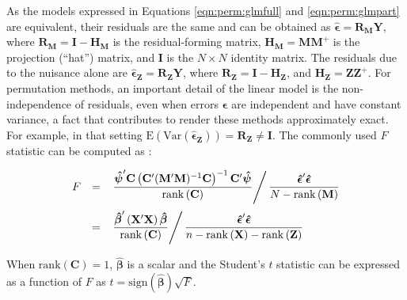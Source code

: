 As the models expressed in Equations \ref{eqn:perm:glmfull} and \ref{eqn:perm:glmpart} are equivalent, their residuals are the same and can be obtained as  $\boldsymbol{\hat{\epsilon}} = \mathbf{R}_{\mathbf{M}}\mathbf{Y}$, where $\mathbf{R}_{\mathbf{M}}=\mathbf{I}-\mathbf{H}_{\mathbf{M}}$ is the residual-forming matrix, $\mathbf{H}_{\mathbf{M}}=\mathbf{M}\mathbf{M}^{+}$ is the projection (``hat'') matrix, and $\mathbf{I}$ is the $N \times N$ identity matrix. The residuals due to the nuisance alone are $\boldsymbol{\hat{\epsilon}}_{\mathbf{Z}} = \mathbf{R}_{\mathbf{Z}}\mathbf{Y}$, where $\mathbf{R}_{\mathbf{Z}}=\mathbf{I}-\mathbf{H}_{\mathbf{Z}}$, and $\mathbf{H}_{\mathbf{Z}} = \mathbf{Z}\mathbf{Z}^{+}$. For permutation methods, an important detail of the linear model is the non-independence of residuals, even when errors $\boldsymbol{\epsilon}$ are independent and have constant variance, a fact that contributes to render these methods approximately exact. For example, in that setting $\mathrm{E}\left(\mathrm{Var}(\boldsymbol{\hat{\epsilon}_{\mathbf{Z}}})\right)=\mathbf{R}_{\mathbf{Z}}\neq\mathbf{I}$. The commonly used $F$ statistic can be computed as \citep{Christensen2002}:

\begin{equation}
\begin{array}{ccl}
F &=& \left.\dfrac{\boldsymbol{\hat{\psi}}'\mathbf{C} \left(\mathbf{C}'(\mathbf{M}'\mathbf{M})^{-1}\mathbf{C} \right)^{-1} \mathbf{C}'\boldsymbol{\hat{\psi}}}{\mathrm{rank}\left(\mathbf{C}\right)} \right/ \dfrac{\boldsymbol{\hat{\epsilon}}'\boldsymbol{\hat{\epsilon}}}{N-\mathrm{rank}\left(\mathbf{M}\right)}\\[15pt]
{} & = & \left.\dfrac{\boldsymbol{\hat{\beta}}' \left(\mathbf{X}'\mathbf{X}\right)\boldsymbol{\hat{\beta}}}{\mathrm{rank}\left(\mathbf{C}\right)} \right/ \dfrac{\boldsymbol{\hat{\epsilon}}'\boldsymbol{\hat{\epsilon}}}{n-\mathrm{rank}\left(\mathbf{X}\right)-\mathrm{rank}\left(\mathbf{Z}\right)}
\end{array}
\label{eqn:perm:fstat}
\end{equation}

\noindent
When $\mathrm{rank}(\mathbf{C}) = 1$, $\boldsymbol{\hat{\beta}}$ is a scalar and the Student's $t$ statistic can be expressed as a function of $F$ as $t=\mathrm{sign}(\boldsymbol{\hat{\beta}})\sqrt{F}$.

